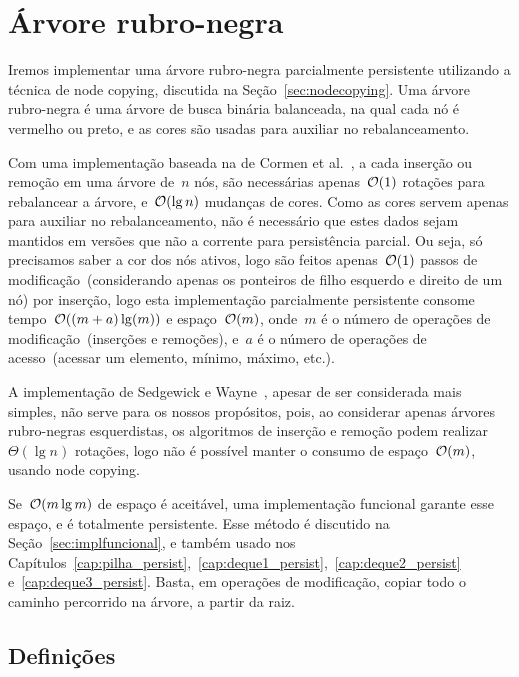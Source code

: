 \documentclass[main.tex]{subfiles}
\begin{document}
\chapter{Árvore rubro-negra} \label{cap:rubronegra_persist}

Iremos implementar uma árvore rubro-negra parcialmente persistente utilizando a técnica de node copying, discutida na Seção~\ref{sec:nodecopying}. Uma árvore rubro-negra é uma árvore de busca binária balanceada, na qual cada nó é vermelho ou preto, e as cores são usadas para auxiliar no rebalanceamento.

Com uma implementação baseada na de Cormen et al.~\cite{CormenRedBlack}, a cada inserção ou remoção em uma árvore de~$n$ nós, são necessárias apenas~$\mathcal{O}(1)$ rotações para rebalancear a árvore, e~$\mathcal{O}(\lg n)$ mudanças de cores. Como as cores servem apenas para auxiliar no rebalanceamento, não é necessário que estes dados sejam mantidos em versões que não a corrente para persistência parcial. Ou seja, só precisamos saber a cor dos nós ativos, logo são feitos apenas~$\mathcal{O}(1)$ passos de modificação~(considerando apenas os ponteiros de filho esquerdo e direito de um nó) por inserção, logo esta implementação parcialmente persistente consome tempo~$\mathcal{O}((m + a) \lg(m))$ e espaço~$\mathcal{O}(m)$, onde~$m$ é o número de operações de modificação~(inserções e remoções), e~$a$ é o número de operações de acesso~(acessar um elemento, mínimo, máximo, etc.).

A implementação de Sedgewick e Wayne~\cite{SedgewickRedBlack}, apesar de ser considerada mais simples, não serve para os nossos propósitos, pois, ao considerar apenas árvores rubro-negras esquerdistas, os algoritmos de inserção e remoção podem realizar~$\Theta(\lg n)$ rotações, logo não é possível manter o consumo de espaço~$\mathcal{O}(m)$, usando node copying.

Se~$\mathcal{O}(m \lg m)$ de espaço é aceitável, uma implementação funcional garante esse espaço, e é totalmente persistente. Esse método é discutido na Seção~\ref{sec:implfuncional}, e também usado nos Capítulos~\ref{cap:pilha_persist},~\ref{cap:deque1_persist},~\ref{cap:deque2_persist} e~\ref{cap:deque3_persist}. Basta, em operações de modificação, copiar todo o caminho percorrido na árvore, a partir da raiz.

\section{Definições}

\end{document}
